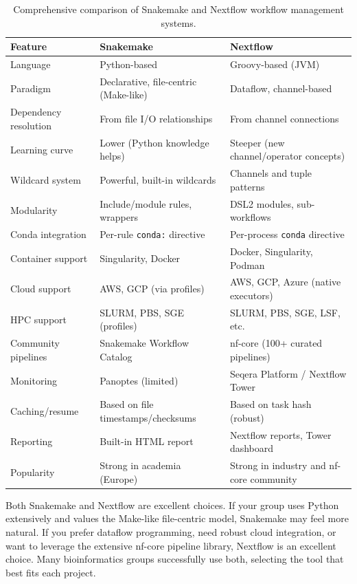 \begin{table}[htbp]
\centering
\caption{Comprehensive comparison of Snakemake and Nextflow workflow management systems.}
\label{tab:smk-vs-nf}
\small
\renewcommand{\arraystretch}{1.3}
\begin{tabularx}{\textwidth}{@{}l X X@{}}
\toprule
\textbf{Feature} & \textbf{Snakemake} & \textbf{Nextflow} \\
\midrule
Language & Python-based & Groovy-based (JVM) \\
Paradigm & Declarative, file-centric (Make-like) & Dataflow, channel-based \\
Dependency resolution & From file I/O relationships & From channel connections \\
Learning curve & Lower (Python knowledge helps) & Steeper (new channel/operator concepts) \\
Wildcard system & Powerful, built-in wildcards & Channels and tuple patterns \\
Modularity & Include/module rules, wrappers & DSL2 modules, sub-workflows \\
Conda integration & Per-rule \texttt{conda:} directive & Per-process \texttt{conda} directive \\
Container support & Singularity, Docker & Docker, Singularity, Podman \\
Cloud support & AWS, GCP (via profiles) & AWS, GCP, Azure (native executors) \\
HPC support & SLURM, PBS, SGE (profiles) & SLURM, PBS, SGE, LSF, etc. \\
Community pipelines & Snakemake Workflow Catalog & nf-core (100+ curated pipelines) \\
Monitoring & Panoptes (limited) & Seqera Platform / Nextflow Tower \\
Caching/resume & Based on file timestamps/checksums & Based on task hash (robust) \\
Reporting & Built-in HTML report & Nextflow reports, Tower dashboard \\
Popularity & Strong in academia (Europe) & Strong in industry and nf-core community \\
\bottomrule
\end{tabularx}
\end{table}

\begin{tipbox}[title={Choosing a Workflow Manager}]
Both Snakemake and Nextflow are excellent choices. If your group uses Python extensively and values the Make-like file-centric model, Snakemake may feel more natural. If you prefer dataflow programming, need robust cloud integration, or want to leverage the extensive nf-core pipeline library, Nextflow is an excellent choice. Many bioinformatics groups successfully use both, selecting the tool that best fits each project.
\end{tipbox}

